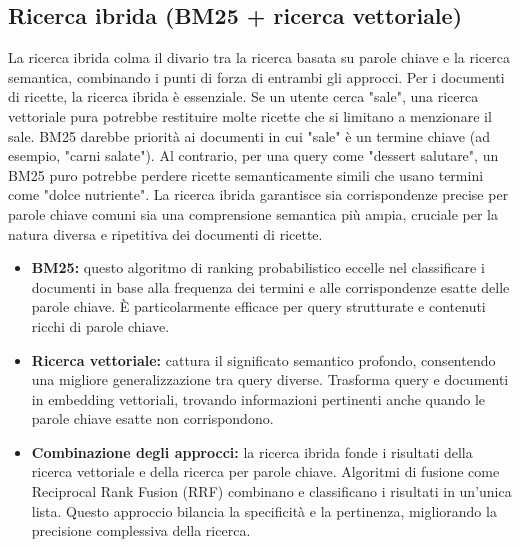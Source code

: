 \documentclass[a4paper, 11pt]{article}
\begin{document}
\subsection{Ricerca ibrida (BM25 + ricerca vettoriale)}
La ricerca ibrida colma il divario tra la ricerca basata su parole chiave e la ricerca semantica, combinando i punti di forza di entrambi gli approcci. \cite{hybrid_search_vectorchord} Per i documenti di ricette, la ricerca ibrida è essenziale. Se un utente cerca "sale", una ricerca vettoriale pura potrebbe restituire molte ricette che si limitano a menzionare il sale. BM25 \cite{hybrid_search_vectorchord} darebbe priorità ai documenti in cui "sale" è un termine chiave (ad esempio, "carni salate"). Al contrario, per una query come "dessert salutare", un BM25 puro potrebbe perdere ricette semanticamente simili che usano termini come "dolce nutriente". La ricerca ibrida garantisce sia corrispondenze precise per parole chiave comuni sia una comprensione semantica più ampia, cruciale per la natura diversa e ripetitiva dei documenti di ricette.
\begin{itemize}
    \item \textbf{BM25:} questo algoritmo di ranking probabilistico eccelle nel classificare i documenti in base alla frequenza dei termini e alle corrispondenze esatte delle parole chiave. \cite{hybrid_search_vectorchord} È particolarmente efficace per query strutturate e contenuti ricchi di parole chiave.
    \item \textbf{Ricerca vettoriale:} cattura il significato semantico profondo, consentendo una migliore generalizzazione tra query diverse. \cite{hybrid_search_vectorchord} Trasforma query e documenti in embedding vettoriali, trovando informazioni pertinenti anche quando le parole chiave esatte non corrispondono.
    \item \textbf{Combinazione degli approcci:} la ricerca ibrida fonde i risultati della ricerca vettoriale e della ricerca per parole chiave. Algoritmi di fusione come Reciprocal Rank Fusion (RRF) combinano e classificano i risultati in un'unica lista. \cite{hybrid_search_vectorchord} Questo approccio bilancia la specificità e la pertinenza, migliorando la precisione complessiva della ricerca.
\end{itemize}
\end{document}
